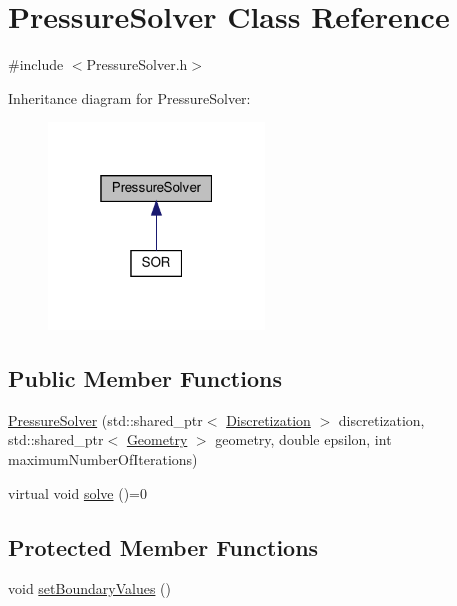 \hypertarget{classPressureSolver}{}\section{Pressure\+Solver Class Reference}
\label{classPressureSolver}


{\ttfamily \#include $<$Pressure\+Solver.\+h$>$}



Inheritance diagram for Pressure\+Solver\+:
\nopagebreak
\begin{figure}[H]
\begin{center}
\leavevmode
\includegraphics[width=163pt]{classPressureSolver__inherit__graph}
\end{center}
\end{figure}
\subsection*{Public Member Functions}
\begin{DoxyCompactItemize}
\item 
\mbox{\hyperlink{classPressureSolver_a0b18d1b4b728c717acb60e17d8afc2e9}{Pressure\+Solver}} (std\+::shared\+\_\+ptr$<$ \mbox{\hyperlink{classDiscretization}{Discretization}} $>$ discretization, std\+::shared\+\_\+ptr$<$ \mbox{\hyperlink{classGeometry}{Geometry}} $>$ geometry, double epsilon, int maximum\+Number\+Of\+Iterations)
\item 
virtual void \mbox{\hyperlink{classPressureSolver_a504ac61a1317650e0eb70d6a93212ca0}{solve}} ()=0
\end{DoxyCompactItemize}
\subsection*{Protected Member Functions}
\begin{DoxyCompactItemize}
\item 
void \mbox{\hyperlink{classPressureSolver_a458c383fcacaf54c1a333a271049ca93}{set\+Boundary\+Values}} ()
\end{DoxyCompactItemize}
